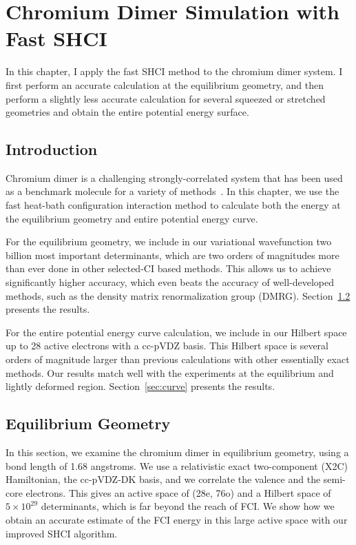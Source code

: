 \chapter{Chromium Dimer Simulation with Fast SHCI}
In this chapter, I apply the fast SHCI method to the chromium dimer system.
I first perform an accurate calculation at the equilibrium geometry, and then perform a slightly less accurate calculation for several squeezed or stretched geometries and obtain the entire potential energy surface.

\section{Introduction}

Chromium dimer is a challenging strongly-correlated system
that has been used as a benchmark molecule for a variety of methods~\cite{Scu-JCP-91,KurYan-JCP-11,PurZhaKra-JCP-15,MaManOlsGag-JCTC-16,VanMalVer-JCTC-16,GuoWatHuSunCha-JCTC-16}.
In this chapter, we use the fast heat-bath configuration interaction method to calculate both the energy at the equilibrium geometry and entire potential energy curve.

For the equilibrium geometry, we include in our variational wavefunction two billion most important determinants, which are two orders of magnitudes more than ever done in other selected-CI based methods.
This allows us to achieve significantly higher accuracy, which even beats the accuracy of well-developed methods, such as the density matrix renormalization group (DMRG).
Section~\ref{sec:eq} presents the results.

For the entire potential energy curve calculation, we include in our Hilbert space up to 28 active electrons with a cc-pVDZ basis.
This Hilbert space is several orders of magnitude larger than previous calculations with other essentially exact methods.
Our results match well with the experiments at the equilibrium and lightly deformed region.
Section~\ref{sec:curve} presents the results.

\section{Equilibrium Geometry}
\label{sec:eq}
In this section, we examine the chromium dimer in equilibrium geometry, using a bond length of 1.68 angstroms.
We use a relativistic exact two-component (X2C) Hamiltonian, the cc-pVDZ-DK basis, and we correlate the valence and the semi-core electrons.
This gives an active space of (28e, 76o) and a Hilbert space of $5\times10^{29}$ determinants, which is far beyond the reach of FCI.
We show how we obtain an accurate estimate of the FCI energy in this large active space with our improved SHCI algorithm.

